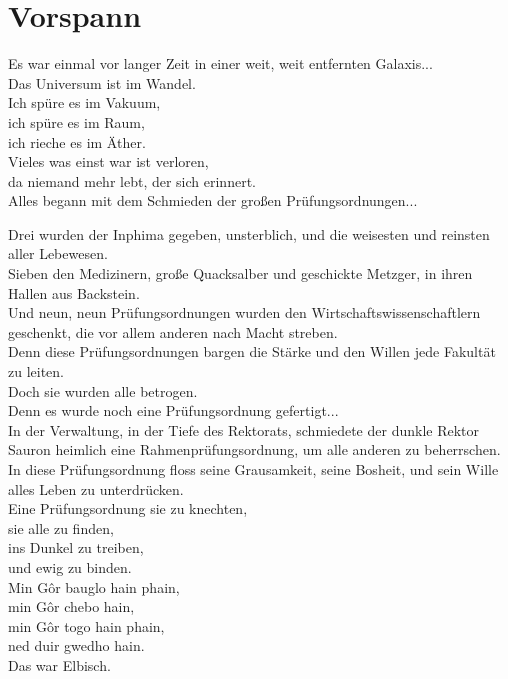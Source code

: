 \newpage
\section{Vorspann}
\label{sec:vorspann}
\charaktere{-}
\setting{-}
\sound{-}
\licht{-}
\requisiten{-}

\begin{verseplay}[7em]
Es war einmal vor langer Zeit in einer weit, weit entfernten Galaxis...\\
Das Universum ist im Wandel.\\
Ich spüre es im Vakuum, \\
ich spüre es im Raum,\\
ich rieche es im Äther.\\
Vieles was einst war ist verloren,\\
da niemand mehr lebt, der sich erinnert.\\
Alles begann mit dem Schmieden der großen Prüfungsordnungen...
\end{verseplay}


\begin{verseplay}[4em]
Drei wurden der Inphima gegeben, unsterblich, und die weisesten und reinsten aller Lebewesen.\\
Sieben den Medizinern, große Quacksalber und geschickte Metzger, in ihren Hallen aus Backstein.\\
Und neun, neun Prüfungsordnungen wurden den Wirtschaftswissenschaftlern geschenkt, die vor allem anderen nach Macht streben.\\
Denn diese Prüfungsordnungen bargen die Stärke und den Willen jede Fakultät zu leiten.\\
Doch sie wurden alle betrogen.\\
Denn es wurde noch eine Prüfungsordnung gefertigt...\\
In der Verwaltung, in der Tiefe des Rektorats, schmiedete der dunkle Rektor Sauron heimlich eine Rahmenprüfungsordnung, um alle anderen zu beherrschen.\\
In diese Prüfungsordnung floss seine Grausamkeit, seine Bosheit, und sein Wille alles Leben zu unterdrücken.\\
Eine Prüfungsordnung sie zu knechten,\\
sie alle zu finden,\\
ins Dunkel zu treiben,\\
und ewig zu binden.\\
Min Gôr bauglo hain phain,\\
min Gôr chebo hain,\\
min Gôr togo hain phain,\\
ned duir gwedho hain.\\
Das war Elbisch.
\end{verseplay}

